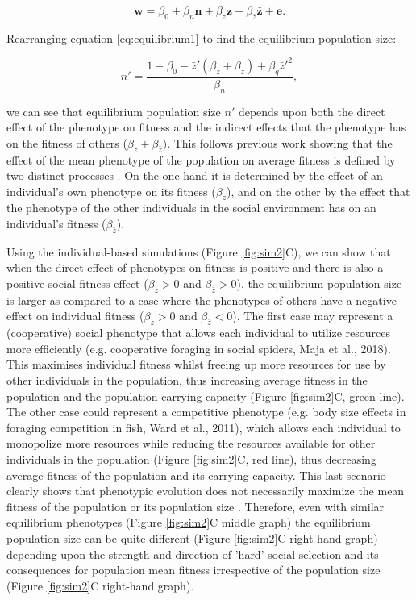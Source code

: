 \documentclass{article}
\begin{document}
\begin{equation} \label{eq: socialselection}
\mathbf{w}=\beta_{0} +\beta_{n} \mathbf{n} + \beta_{z} \mathbf{z}+ \beta_{\bar{z}} \bar{\mathbf{z}}+ \mathbf{e}.
\end{equation}
 
\noindent Rearranging equation \ref{eq:equilibrium1} to find the equilibrium population size:
 
\begin{equation}
n' = \frac{1-\beta_{0} - \bar{z}'(\beta_{z} + \beta_{\bar{z}} )+  \beta_{q} \bar{z}'^2}{\beta_{n}},
\end{equation}

\noindent we can see that equilibrium population size $n'$ depends upon both the direct effect of the phenotype on fitness and the indirect effects that the phenotype has on the fitness of others ($\beta_{z} + \beta_{\bar{z}})$. This follows previous work showing that the effect of the mean phenotype of the population on average fitness is defined by two distinct processes \citep{Engen2020, Lande2007, Abrams1993}. On the one hand it is determined by the effect of an individual's own phenotype on its fitness ($\beta_{z}$), and on the other by the effect that the phenotype of the other individuals in the social environment has on an individual's fitness ($\beta_{\bar{z}}$).

Using the individual-based simulations (Figure \ref{fig:sim2}C), we can show that when the direct effect of phenotypes on fitness is positive and there is also a positive social fitness effect ($\beta_{z}>0$ and $\beta_{\bar{z}}>0$), the equilibrium population size is larger as compared to a case where the phenotypes of others have a negative effect on individual fitness ($\beta_{z}>0$ and $\beta_{\bar{z}}<0$). The first case may represent a (cooperative) social phenotype that allows each individual to utilize resources more efficiently (e.g. cooperative foraging in social spiders, Maja et al., 2018). This maximises individual fitness whilst freeing up more resources for use by other individuals in the population, thus increasing average fitness in the population and the population carrying capacity (Figure \ref{fig:sim2}C, green line). The other case could represent a competitive phenotype (e.g. body size effects in foraging competition in fish, Ward et al., 2011), which allows each individual to monopolize more resources while reducing the resources available for other individuals in the population (Figure \ref{fig:sim2}C, red line), thus decreasing average fitness of the population and its carrying capacity. This last scenario clearly shows that phenotypic evolution does not necessarily maximize the mean fitness of the population or its population size \citep{Wright1969, Abrams1993}. Therefore, even with similar equilibrium phenotypes (Figure \ref{fig:sim2}C middle graph) the equilibrium population size can be quite different (Figure \ref{fig:sim2}C right-hand graph) depending upon the strength and direction of 'hard' social selection and its consequences for population mean fitness irrespective of the population size (Figure \ref{fig:sim2}C right-hand graph).
\end{document}
